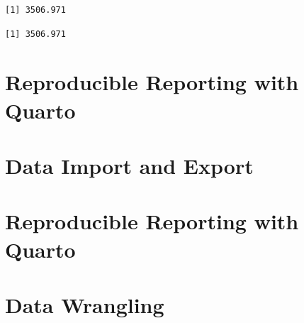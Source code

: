 \documentclass[
  letterpaper,
  DIV=11,
  numbers=noendperiod]{scrreprt}
\newenvironment{Shaded}{\begin{snugshade}}{\end{snugshade}}
\newcommand{\AttributeTok}[1]{\textcolor[rgb]{0.40,0.45,0.13}{#1}}
\newcommand{\CommentTok}[1]{\textcolor[rgb]{0.37,0.37,0.37}{#1}}
\newcommand{\ConstantTok}[1]{\textcolor[rgb]{0.56,0.35,0.01}{#1}}
\newcommand{\FunctionTok}[1]{\textcolor[rgb]{0.28,0.35,0.67}{#1}}
\newcommand{\NormalTok}[1]{\textcolor[rgb]{0.00,0.23,0.31}{#1}}
\newcommand{\SpecialCharTok}[1]{\textcolor[rgb]{0.37,0.37,0.37}{#1}}
\begin{document}
\begin{Shaded}
\end{Shaded}

\begin{verbatim}
[1] 3506.971
\end{verbatim}

\begin{Shaded}
\end{Shaded}

\begin{verbatim}
[1] 3506.971
\end{verbatim}


\chapter{Reproducible Reporting with
Quarto}\label{reproducible-reporting-with-quarto}


\chapter{Data Import and Export}\label{data-import-and-export}


\chapter{Reproducible Reporting with
Quarto}\label{reproducible-reporting-with-quarto-1}


\chapter{Data Wrangling}\label{data-wrangling}
\end{document}
